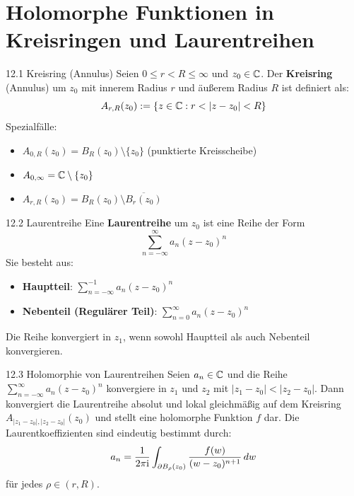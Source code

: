 \setcounter{section}{11} %
\section{Holomorphe Funktionen in Kreisringen und Laurentreihen}



\begin{defi}{12.1 Kreisring (Annulus)}
Seien $0 \le r < R \le \infty$ und $z_0 \in \mathbb{C}$. Der \textbf{Kreisring} (Annulus) um $z_0$ mit innerem Radius $r$ und äußerem Radius $R$ ist definiert als:
\[
    A_{r,R}(z_0) := \{z \in \mathbb{C} : r < |z-z_0| < R\}
\]
Spezialfälle:
\begin{itemize}
    \item $A_{0,R}(z_0) = B_R(z_0) \setminus \{z_0\}$ (punktierte Kreisscheibe)
    \item $A_{0,\infty} = \mathbb{C} \setminus \{z_0\}$
    \item $A_{r,R}(z_0) = B_R(z_0) \setminus \overline{B_r(z_0)}$
\end{itemize}
\end{defi}

\begin{defi}{12.2 Laurentreihe}
Eine \textbf{Laurentreihe} um $z_0$ ist eine Reihe der Form
\[
    \sum_{n=-\infty}^\infty a_n (z-z_0)^n
\]
Sie besteht aus:
\begin{itemize}
    \item \textbf{Hauptteil}: $\sum_{n=-\infty}^{-1} a_n (z-z_0)^n$
    \item \textbf{Nebenteil (Regulärer Teil)}: $\sum_{n=0}^\infty a_n (z-z_0)^n$
\end{itemize}
Die Reihe konvergiert in $z_1$, wenn sowohl Hauptteil als auch Nebenteil konvergieren.
\end{defi}

\begin{satz}{12.3 Holomorphie von Laurentreihen}
Seien $a_n \in \mathbb{C}$ und die Reihe $\sum_{n=-\infty}^\infty a_n (z-z_0)^n$ konvergiere in $z_1$ und $z_2$ mit $|z_1-z_0| < |z_2-z_0|$. Dann konvergiert die Laurentreihe absolut und lokal gleichmäßig auf dem Kreisring $A_{|z_1-z_0|, |z_2-z_0|}(z_0)$ und stellt eine holomorphe Funktion $f$ dar. Die Laurentkoeffizienten sind eindeutig bestimmt durch:
\[
    a_n = \frac{1}{2\pi\mathrm{i}} \int_{\partial B_\rho(z_0)} \frac{f(w)}{(w-z_0)^{n+1}} \, dw
\]
für jedes $\rho \in (r, R)$.
\end{satz}

